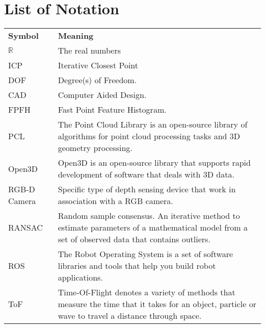 
\appendix
\chapter*{List of Notation}
\label{chap:notation}
\begin{tabularx}{\linewidth}
{ l >{\raggedright\arraybackslash}X }
\bfseries Symbol & \bfseries Meaning \\\Midrule
$\mathbb{R}$ & The real numbers \\
ICP & Iterative Closest Point\\
DOF & Degree(s) of Freedom.\\
CAD & Computer Aided Design.\\
FPFH & Fast Point Feature Histogram.\\
PCL & The Point Cloud Library is an open-source library of algorithms for point cloud processing tasks and 3D geometry processing. \\
Open3D & Open3D is an open-source library that supports rapid development of software that deals with 3D data.\\
RGB-D Camera & Specific type of depth sensing device that work in association with a RGB camera.\\
RANSAC & Random sample consensus. An iterative method to estimate parameters of a mathematical model from a set of observed data that contains outliers.\\
ROS & The Robot Operating System is a set of software libraries and tools that help you build robot applications.\\
ToF & Time-Of-Flight denotes a variety of methods that measure the time that it takes for an object,
particle or wave to travel a distance through space.

\end{tabularx}